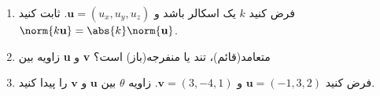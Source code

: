 {\begin{spacing}{1.5}
\begin{enumerate}[label=\textbf{\arabic*}.]
            \item {فرض کنید $k$ یک اسکالر باشد و $\textbf{u}=(u_x,u_y,u_z)$. ثابت کنید $\norm{k\textbf{u}}=\abs{k}\norm{\textbf{u}}$.}

            \item {زاویه بین \textbf{u} و \textbf{v} متعامد(قائم)، تند یا منفرجه(باز) است؟}
            \begin{flushleft}
            \end{flushleft} \textbf{\vspace{-12pt}}

            \item {فرض کنید $\textbf{u}=(-1,3,2)$ و $\textbf{v}=(3,-4,1)$. زاویه $\theta$ بین $\textbf{u}$ و $\textbf{v}$ را پیدا کنید.}


\end{enumerate}
\end{spacing}}
